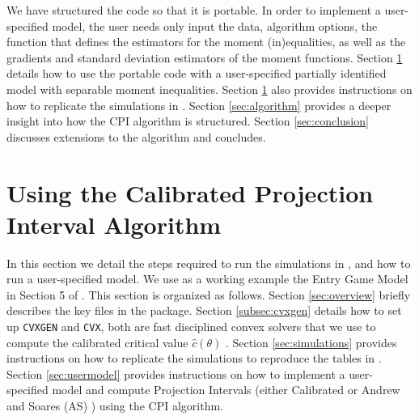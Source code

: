 \documentclass[12pt]{article}
\def\code#1{\texttt{#1}}
\begin{document}
We have structured the code so that it is portable.  In order to implement a user-specified model, the user needs only input the data, algorithm options, the function that defines the estimators for the moment (in)equalities, as well as the gradients and standard deviation estimators of the moment functions.    Section \ref{sec:using} details how to use the portable code with a user-specified partially identified model with separable moment inequalities.  Section \ref{sec:using} also provides instructions on how to replicate the simulations in .     Section \ref{sec:algorithm} provides a deeper insight into how the CPI algorithm is structured. Section \ref{sec:conclusion} discusses extensions to the algorithm and concludes.


\section{Using the Calibrated Projection Interval Algorithm} \label{sec:using}
In this section we detail the steps required to run the simulations in , and how to run  a user-specified model.  We use as a working example the Entry Game Model in Section 5 of .   This section is organized as follows.  Section \ref{sec:overview} briefly describes the key files in the package.  Section \ref{subsec:cvxgen} details how to set up \code{CVXGEN} and \code{CVX}, both are fast disciplined convex solvers that we use to compute the calibrated critical value $\hat c(\theta)$ \cite{mattingley2012cvxgen,cvx,gb08}.  Section \ref{sec:simulations} provides instructions on how to replicate the simulations to reproduce the tables in .  Section \ref{sec:usermodel} provides instructions on how to implement a user-specified model and compute Projection Intervals (either Calibrated or Andrew and Soares (AS) \cite{andrews2010inference}) using the CPI algorithm.
\end{document}
